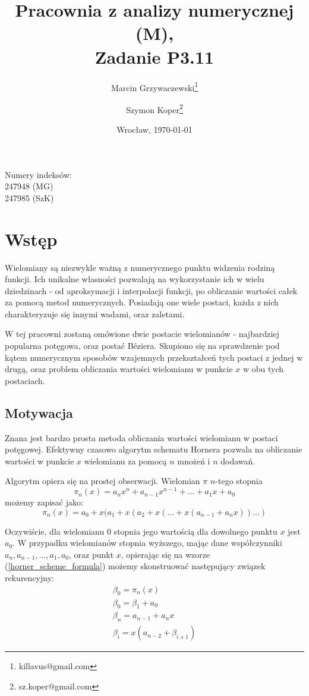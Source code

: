 \documentclass[wide, 11pt]{mwart}
\date{Wrocław, \today}
\title{Pracownia z analizy numerycznej (M),\\[8pt]\large{Zadanie P3.11}}
\author{Marcin Grzywaczewski\footnote{killavus@gmail.com} \and Szymon Koper\footnote{sz.koper@gmail.com}}
\begin{document}
	\maketitle
	\begin{center}
	Numery indeksów:\\247948 (MG)\\247985 (SzK)
	\end{center}
	\thispagestyle{empty}
	\newpage

\section{Wstęp}
Wielomiany są niezwykle ważną z numerycznego punktu widzenia rodziną funkcji.
Ich unikalne własności pozwalają na wykorzystanie ich w wielu dziedzinach -
od aproksymacji i interpolacji funkcji, po obliczanie wartości całek za pomocą
metod numerycznych. Posiadają one wiele postaci, każda z nich charakteryzuje
się innymi wadami, oraz zaletami.

W tej pracowni zostaną omówione dwie postacie wielomianów - najbardziej 
popularna potęgowa, oraz postać Béziera. Skupiono się na sprawdzenie pod kątem
numerycznym sposobów wzajemnych przekształceń tych postaci z jednej w drugą,
oraz problem obliczania wartości wielomianu w punkcie $x$ w obu tych 
postaciach.

\subsection{Motywacja}
Znana jest bardzo prosta metoda obliczania wartości wielomianu w postaci
potęgowej. Efektywny czasowo algorytm schematu Hornera pozwala na obliczanie
wartości w punkcie $x$ wielomianu za pomocą $n$ mnożeń i $n$ dodawań.

Algorytm opiera się na prostej obserwacji. Wielomian $\pi$ $n$-tego stopnia
\[\pi_n(x) = a_nx^n + a_{n-1}x^{n-1} + \ldots + a_1x + a_0\] możemy zapisać 
jako:
\begin{equation}
  \label{horner_scheme_formula}
  \pi_n(x) = a_0 + x(a_1 + x(a_2 + x(\ldots + x(a_{n-1} + a_nx))\ldots)
\end{equation}

Oczywiście, dla wielomianu $0$ stopnia jego wartością dla dowolnego punktu $x$
jest $a_0$. W przypadku wielomianów stopnia wyższego, mając dane współczynniki
$a_n, a_{n-1}, \ldots, a_1, a_0$, oraz punkt $x$, opierając się na wzorze 
(\ref{horner_scheme_formula}) możemy skonstruować następujący związek 
rekurencyjny:
\begin{subequations}
  \begin{align}
    \beta_0 = \pi_n(x)\\
    \beta_0 = \beta_1 + a_0\\
    \beta_n = a_{n-1} + a_nx\\
    \beta_i = x(a_{n-2} + \beta_{i+1})
  \end{align}
\end{subequations}
\end{document}
